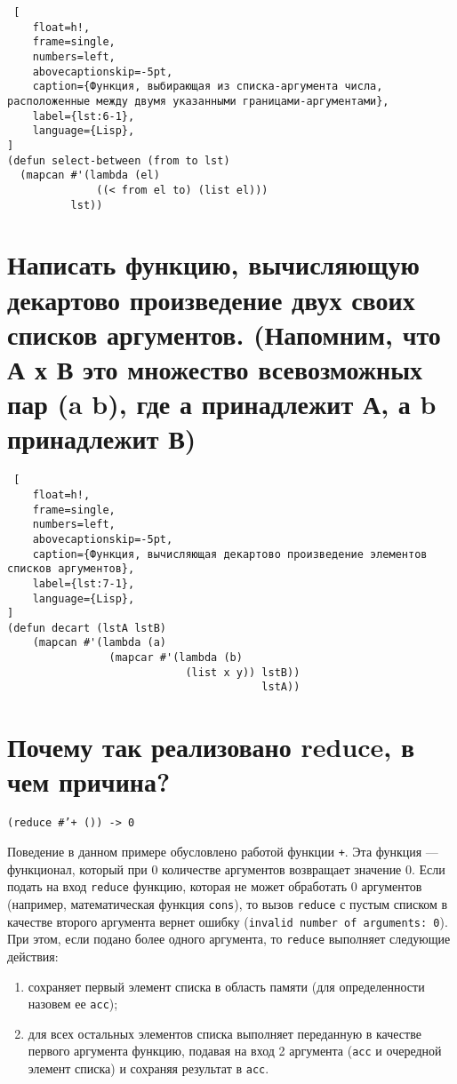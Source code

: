 \begin{lstlisting} [
	float=h!,
	frame=single,
	numbers=left,
	abovecaptionskip=-5pt,
	caption={Функция, выбирающая из списка-аргумента числа, расположенные между двумя указанными границами-аргументами},
	label={lst:6-1},
	language={Lisp},
]
(defun select-between (from to lst)
  (mapcan #'(lambda (el)
              ((< from el to) (list el)))
          lst))
\end{lstlisting}

\section{Написать функцию, вычисляющую декартово произведение двух своих списков аргументов. (Напомним, что А х В это множество всевозможных пар (a b), где а принадлежит А, а b принадлежит В)}

\begin{lstlisting} [
	float=h!,
	frame=single,
	numbers=left,
	abovecaptionskip=-5pt,
	caption={Функция, вычисляющая декартово произведение элементов списков аргументов},
	label={lst:7-1},
	language={Lisp},
]
(defun decart (lstA lstB)
    (mapcan #'(lambda (a)
                (mapcar #'(lambda (b)
                            (list x y)) lstB))
                                        lstA))
\end{lstlisting}

\section{Почему так реализовано reduce, в чем причина?}

\texttt{(reduce \#'+ ()) -> 0}

Поведение в данном примере обусловлено работой функции \texttt{+}. Эта функция --- функционал, который при 0 количестве аргументов возвращает значение 0. Если подать на вход \texttt{reduce} функцию, которая не может обработать 0 аргументов (например, математическая функция \texttt{cons}), то вызов \texttt{reduce} с пустым списком в качестве второго аргумента вернет ошибку (\texttt{invalid number of arguments: 0}). При этом, если подано более одного аргумента, то \texttt{reduce} выполняет следующие действия:
\begin{enumerate}
    \item сохраняет первый элемент списка в область памяти (для определенности назовем ее \texttt{acc});
    \item для всех остальных элементов списка выполняет переданную в качестве первого аргумента функцию, подавая на вход 2 аргумента (\texttt{acc} и очередной элемент списка) и сохраняя результат в \texttt{acc}.
\end{enumerate}


